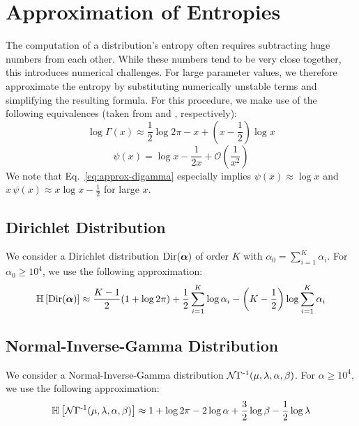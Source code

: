 \section{Approximation of Entropies}

The computation of a distribution's entropy often requires subtracting huge numbers from each other. While these numbers tend to be very close together, this introduces numerical challenges. For large parameter values, we therefore approximate the entropy by substituting numerically unstable terms and simplifying the resulting formula. For this procedure, we make use of the following equivalences (taken from \citet{loggamma} and \citet{digamma}, respectively):
%
\begin{equation}
    \log{\Gamma(x)} \approx \frac{1}{2} \log{2\pi} - x + \left(x - \frac{1}{2}\right) \log{x}
\end{equation}
%
\begin{equation}\label{eq:approx-digamma}
    \psi(x) = \log{x} - \frac{1}{2x} + \mathcal{O}\left( \frac{1}{x^2} \right)
\end{equation}
%
We note that Eq.~\ref{eq:approx-digamma} especially implies $\psi(x) \approx \log{x}$ and $x \, \psi(x) \approx x \log{x} - \frac{1}{2}$ for large $x$.

\subsection{Dirichlet Distribution}

We consider a Dirichlet distribution $\operatorname{Dir}(\bm{\alpha})$ of order $K$ with $\alpha_0 = \sum_{i=1}^K{\alpha_i}$. For $\alpha_0 \ge 10^4$, we use the following approximation:
%
\begin{equation}
    \operatorname{\mathbb{H}}\left[\operatorname{Dir}(\bm{\alpha})\right] \approx \frac{K-1}{2} (1 + \log{2\pi}) + \frac{1}{2} \sum_{i=1}^K{\log{\alpha_i}} - \left(K - \frac{1}{2}\right) \log{\sum_{i=1}^K{\alpha_i}} 
\end{equation}

\subsection{Normal-Inverse-Gamma Distribution}

We consider a Normal-Inverse-Gamma distribution $\operatorname{\mathcal{N}\Gamma^{-1}}(\mu, \lambda, \alpha, \beta)$. For $\alpha \ge 10^4$, we use the following approximation:
\begin{equation}\label{eq:entropy}
    \operatorname{\mathbb{H}}\left[\operatorname{\mathcal{N}\Gamma^{-1}}(\mu, \lambda, \alpha, \beta)\right] \approx 1 + \log{2\pi} - 2 \log{\alpha} + \frac{3}{2} \log{\beta} - \frac{1}{2} \log{\lambda}
\end{equation}


